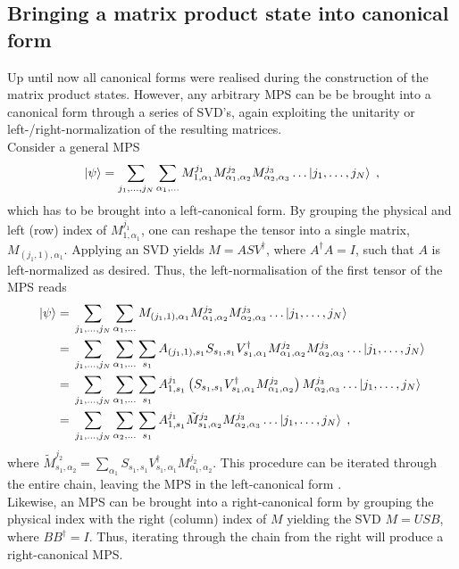 \subsection{Bringing a matrix product state into canonical form}
Up until now all canonical forms were realised during the construction of the matrix product states. However, any arbitrary MPS can be be brought into a canonical form through a series of SVD's, again exploiting the unitarity or left-/right-normalization of the resulting matrices.\\
Consider a general MPS
\begin{equation}
	\ket{\psi} = \sum_{j_1 , \ldots , j_N} \sum_{\alpha_1 , \ldots } M_{1 , \alpha_1}^{j_1} M_{\alpha_1 , \alpha_2}^{j_2} M_{\alpha_2 , \alpha_3}^{j_3} \ldots \ket{j_1 , \ldots , j_N} \; , 
	\label{eq:generalMPS}
\end{equation}
which has to be brought into a left-canonical form. By grouping the physical and left (row) index of $M_{1 , \alpha_1}^{j_1}$, one can reshape the tensor into a single matrix, $M_{(j_1 , 1) , \alpha_1}$. Applying an SVD yields $M = A S V^{\dag}$, where $A^{\dag} A = I$, such that $A$ is left-normalized as desired. Thus, the left-normalisation of the first tensor of the MPS reads
\begin{align}
\ket{\psi} = & \; \sum_{j_1 , \ldots , j_N} \sum_{\alpha_1 , \ldots } M_{(j_1 , 1) , \alpha_1} M_{\alpha_1 , \alpha_2}^{j_2} M_{\alpha_2 , \alpha_3}^{j_3} \ldots \ket{j_1 , \ldots , j_N} \nonumber \\
= & \; \sum_{j_1 , \ldots , j_N} \sum_{\alpha_1 , \ldots } \sum_{s_1} A_{(j_1 , 1) , s_1} S_{s_1 , s_1} V_{s_1 , \alpha_1}^{\dag} M_{\alpha_1 , \alpha_2}^{j_2} M_{\alpha_2 , \alpha_3}^{j_3} \ldots \ket{j_1 , \ldots , j_N} \nonumber \\
= & \; \sum_{j_1 , \ldots , j_N} \sum_{\alpha_1 , \ldots } \sum_{s_1} A_{1 , s_1}^{j_1} \left( S_{s_1 , s_1} V_{s_1 , \alpha_1}^{\dag} M_{\alpha_1 , \alpha_2}^{j_2} \right) M_{\alpha_2 , \alpha_3}^{j_3} \ldots \ket{j_1 , \ldots , j_N} \nonumber \\
= & \; \sum_{j_1 , \ldots , j_N} \sum_{\alpha_2 , \ldots } \sum_{s_1} A_{1 , s_1}^{j_1} \tilde{M}_{s_1 , \alpha_2}^{j_2} M_{\alpha_2 , \alpha_3}^{j_3} \ldots \ket{j_1 , \ldots , j_N} \; ,
\end{align}
where $\tilde{M}_{s_1 , \alpha_2}^{j_2} = \sum_{\alpha_1} S_{s_1 , s_1} V_{s_1 , \alpha_1}^{\dag} M_{\alpha_1 , \alpha_2}^{j_2}$. This procedure can be iterated through the entire chain, leaving the MPS in the left-canonical form \cite{Schollwock}.\\
Likewise, an MPS can be brought into a right-canonical form by grouping the physical index with the right (column) index of $M$ yielding the SVD $M = U S B$, where $B B^{\dag} = I$. Thus, iterating through the chain from the right will produce a right-canonical MPS.

